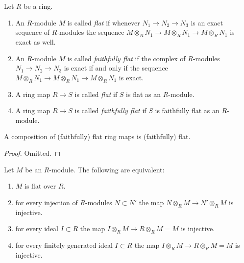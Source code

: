 \begin{definition}
\label{definition-flat}
Let $R$ be a ring.
\begin{enumerate}
\item An $R$-module $M$ is called {\it flat} if whenever
$N_1 \to N_2 \to N_3$ is an exact sequence of $R$-modules
the sequence $M\otimes_R N_1 \to M\otimes_R N_1\to M\otimes_R N_1$
is exact as well.
\item An $R$-module $M$ is called {\it faithfully flat} if the
complex of $R$-modules
$N_1 \to N_2 \to N_3$ is exact if and only if
the sequence $M\otimes_R N_1\to M\otimes_R N_1\to M\otimes_R N_1$
is exact.
\item A ring map $R \to S$ is called {\it flat} if
$S$ is flat as an $R$-module.
\item A ring map $R \to S$ is called {\it faithfully flat} if
$S$ is faithfully flat as an $R$-module.
\end{enumerate}
\end{definition}

\begin{lemma}
\label{lemma-composition-flat}
A composition of (faithfully) flat ring maps is
(faithfully) flat.
\end{lemma}

\begin{proof}
Omitted.
\end{proof}

\begin{lemma}
\label{lemma-flat}
Let $M$ be an $R$-module. The following are equivalent:
\begin{enumerate}
\item $M$ is flat over $R$.
\label{flat}
\item for every injection of $R$-modules $N \subset N'$
the map $N\otimes_R M \to N'\otimes_R M$ is injective.
\label{injective}
\item for every ideal $I \subset R$ the map
$I\otimes_R M \to R\otimes_R M = M$ is injective.
\label{f-ideal}
\item for every finitely generated ideal $I \subset R$
the map $I\otimes_R M \to R\otimes_R M = M$ is injective.
\label{ffg-ideal}
\end{enumerate}
\end{lemma}

